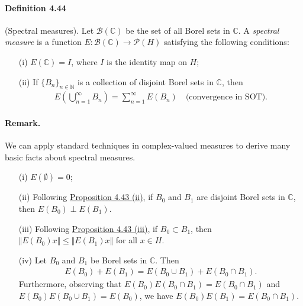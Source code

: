 \documentclass{article}
\begin{document}
\paragraph{Definition 4.44\label{def:4.44}} (Spectral measures). Let $\mathscr{B}(\mathbb{C})$ be the set of all Borel sets in $\mathbb{C}$. A \textit{spectral measure} is a function $E:\mathscr{B}(\mathbb{C})\to\mathcal{P}(H)$ satisfying the following conditions: 
\begin{itemize}
	\item[(i)] $E(\mathbb{C})=I$, where $I$ is the identity map on $H$; \item[(ii)] If $\{B_n\}_{n\in\mathbb{N}}$ is a collection of disjoint Borel sets in $\mathbb{C}$, then
	\begin{align*}
		E\left(\bigcup_{n=1}^\infty B_n\right) = \sum_{n=1}^\infty E(B_n)\quad\text{(convergence in SOT)}.
	\end{align*}
\end{itemize}
\paragraph{Remark.} We can apply standard techniques in complex-valued measures to derive many basic facts about spectral measures.
\begin{itemize}
\item[(i)] $E(\emptyset)=0$;
\item[(ii)] Following \hyperref[prop:4.43]{Proposition 4.43 (ii)}, if  $B_0$ and $B_1$ are disjoint Borel sets in $\mathbb{C}$, then $E(B_0)\perp E(B_1)$.
\item[(iii)] Following \hyperref[prop:4.43]{Proposition 4.43 (iii)}, if $B_0\subset B_1$, then $\Vert E(B_0)x\Vert\leq\Vert E(B_1)x\Vert$ for all $x\in H$.
\item[(iv)] Let $B_0$ and $B_1$ be Borel sets in $\mathbb{C}$. Then
\begin{align*}
	E(B_0)+E(B_1)=E(B_0\cup B_1) + E(B_0\cap B_1).
\end{align*}
Furthermore, observing that $E(B_0)E(B_0\cap B_1)=E(B_0\cap B_1)$ and $E(B_0)E(B_0\cup B_1)=E(B_0)$, we have $E(B_0)E(B_1)=E(B_0\cap B_1)$.
\end{itemize} 
\end{document}
